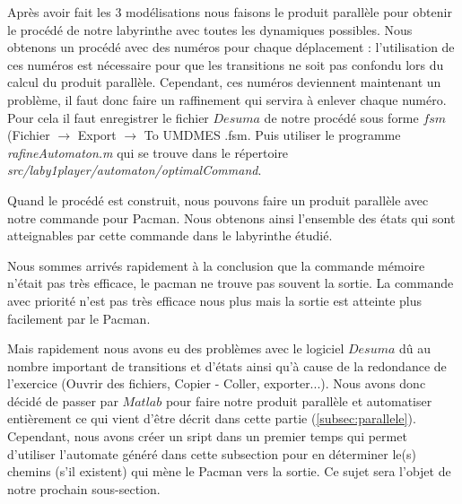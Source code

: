 % 



Après avoir fait les 3 modélisations nous faisons le produit parallèle pour obtenir le procédé de notre labyrinthe avec toutes les dynamiques possibles. Nous obtenons un procédé avec des numéros pour chaque déplacement : l'utilisation de ces numéros est nécessaire pour que les transitions ne soit pas confondu lors du calcul du produit parallèle. Cependant, ces numéros deviennent maintenant un problème, il faut donc faire un raffinement qui servira à enlever chaque numéro. Pour cela il faut enregistrer le fichier $Desuma$ de notre procédé sous forme $fsm$ (Fichier $\rightarrow $ Export $\rightarrow $ To UMDMES .fsm. Puis utiliser le programme \emph{rafineAutomaton.m} qui se trouve dans le répertoire \emph{src/laby1player/automaton/optimalCommand}.


Quand le procédé est construit, nous pouvons faire un produit parallèle avec notre commande pour Pacman. Nous obtenons ainsi l'ensemble des états qui sont atteignables par cette commande dans le labyrinthe étudié.


Nous sommes arrivés rapidement à la conclusion que la commande mémoire n'était pas très efficace, le pacman ne trouve pas souvent la sortie. La commande avec priorité n'est pas très efficace nous plus mais la sortie est atteinte plus facilement par le Pacman.


Mais rapidement nous avons eu des problèmes avec le logiciel $Desuma$ dû au nombre important de transitions et d'états ainsi qu'à cause de la redondance de l'exercice (Ouvrir des fichiers, Copier - Coller, exporter...). Nous avons donc décidé de passer par $Matlab$ pour faire notre produit parallèle et automatiser entièrement ce qui vient d'être décrit dans cette partie (\ref{subsec:parallele}). Cependant, nous avons créer un sript dans un premier temps qui permet d'utiliser l'automate généré dans cette subsection pour en déterminer le(s) chemins (s'il existent) qui mène le Pacman vers la sortie. %
Ce sujet sera l'objet  de notre prochain sous-section.
